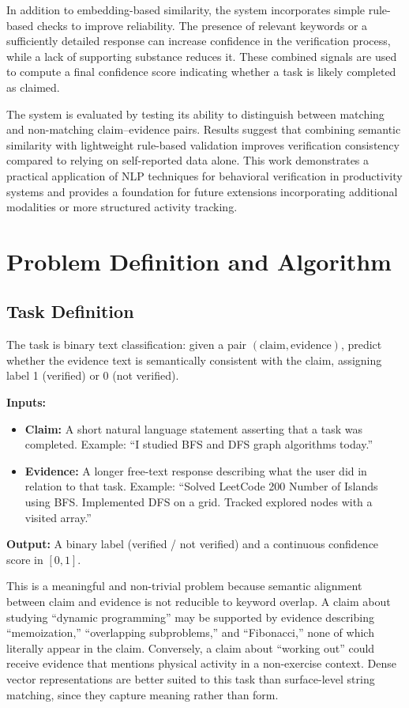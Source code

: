 \documentclass[11pt]{article}
\begin{document}
In addition to embedding-based similarity, the system incorporates simple rule-based
checks to improve reliability. The presence of relevant keywords or a sufficiently
detailed response can increase confidence in the verification process, while a lack of
supporting substance reduces it. These combined signals are used to compute a final
confidence score indicating whether a task is likely completed as claimed.

The system is evaluated by testing its ability to distinguish between matching and
non-matching claim--evidence pairs. Results suggest that combining semantic similarity
with lightweight rule-based validation improves verification consistency compared to
relying on self-reported data alone. This work demonstrates a practical application of
NLP techniques for behavioral verification in productivity systems and provides a
foundation for future extensions incorporating additional modalities or more structured
activity tracking.

\section{Problem Definition and Algorithm}

\subsection{Task Definition}

The task is binary text classification: given a pair $(\text{claim}, \text{evidence})$,
predict whether the evidence text is semantically consistent with the claim, assigning
label 1 (verified) or 0 (not verified).

\textbf{Inputs:}
\begin{itemize}
    \item \textbf{Claim:} A short natural language statement asserting that a task was
    completed. Example: ``I studied BFS and DFS graph algorithms today.''
    \item \textbf{Evidence:} A longer free-text response describing what the user did
    in relation to that task. Example: ``Solved LeetCode 200 Number of Islands using
    BFS. Implemented DFS on a grid. Tracked explored nodes with a visited array.''
\end{itemize}

\textbf{Output:} A binary label (verified / not verified) and a continuous confidence
score in $[0, 1]$.

This is a meaningful and non-trivial problem because semantic alignment between claim
and evidence is not reducible to keyword overlap. A claim about studying ``dynamic
programming'' may be supported by evidence describing ``memoization,'' ``overlapping
subproblems,'' and ``Fibonacci,'' none of which literally appear in the claim.
Conversely, a claim about ``working out'' could receive evidence that mentions physical
activity in a non-exercise context. Dense vector representations are better suited to
this task than surface-level string matching, since they capture meaning rather than
form.
\end{document}
